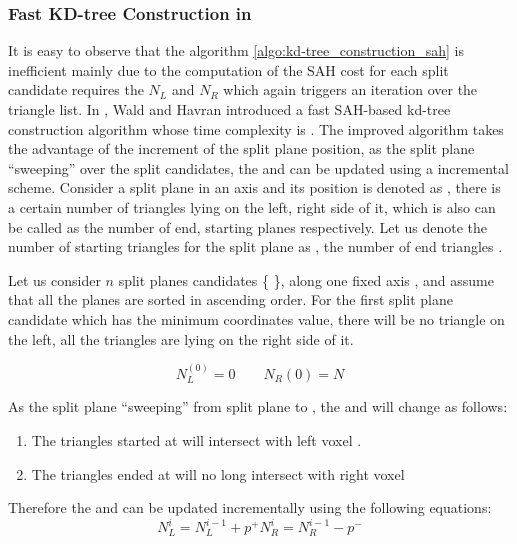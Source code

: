 \subsubsection{Fast KD-tree Construction in \mycomplexitynlogn} 
It is easy to observe that the algorithm \ref{algo:kd-tree_construction_sah} is inefficient mainly due to the computation of the SAH cost for each split candidate requires the \(N_{L}\) and \(N_{R}\) which again triggers an iteration over the triangle list. In \cite{wh2006}, Wald and Havran introduced a fast SAH-based kd-tree construction algorithm whose time complexity is \mycomplexitynlogn. The improved algorithm takes the advantage of the increment of the split plane position, as the split plane ``sweeping'' over the split candidates,  the \mynumtrileft and \mynumtriright can be updated using a incremental scheme. Consider a split plane \mysplitplane in an axis \mydimension and its position is denoted as \mysplitplanepos, there is a certain number of triangles lying on the left, right side of it, which is also can be called as the number of end, starting planes respectively. Let us denote the number of starting triangles for the split plane \mysplitplane as \mynumtristartp, the number of end triangles \mynumtriendp.   

Let us consider \(n\) split planes candidates \{  \}, along one fixed axis \mydimension, and assume that all the planes are sorted in ascending order. For the first split plane candidate  which has the minimum coordinates value, there will be no triangle on the left, all the triangles are lying on the right side of it. 

\begin{displaymath} 
    N_{L}^{(0)} = 0 \qquad N_{R}{(0)} = N
\end{displaymath} 

As the split plane ``sweeping'' from split plane  to , the \mynumtrileft and \mynumtriright will change as follows: 
\begin{enumerate} 
    \item The triangles started at  will intersect with left voxel \myleftchildbox. 
    \item The triangles ended at  will no long intersect with right voxel \myrightchildbox 
\end{enumerate}

Therefore the \mynumtrileft and \mynumtriright can be updated incrementally using the following equations: 
\begin{equation}
	N_{L}^{i} = N_{L}^{i-1} + p^{+}
	N_{R}^{i} = N_{R}^{i-1} - p^{-}
    \label{eq:SweepUpdate}
\end{equation}

